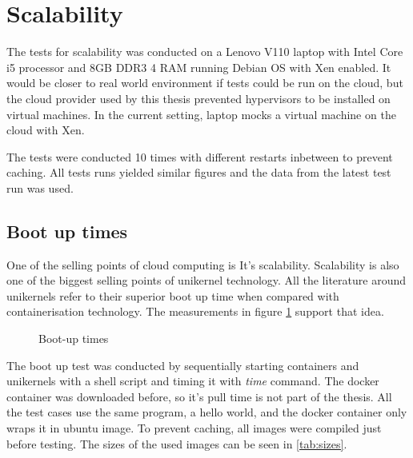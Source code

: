 \section{Scalability}
The tests for scalability was conducted on a Lenovo V110 laptop with Intel Core i5 processor and 8GB DDR3 4 RAM running Debian OS with Xen enabled. It would be closer to real world environment if tests could be run on the cloud, but the cloud provider used by this thesis prevented hypervisors to be installed on virtual machines. In the current setting, laptop mocks a virtual machine on the cloud with Xen.

The tests were conducted 10 times with different restarts inbetween to prevent caching. All tests runs yielded similar figures and the data from the latest test run was used. 
\subsection{Boot up times}


One of the selling points of cloud computing is It's scalability. Scalability is also one of the biggest selling points of unikernel technology. All the literature around unikernels refer to their superior boot up time when compared with containerisation technology. The measurements in figure \ref{fig:boot-up} support that idea. 
\begin{figure}[htpb]
  \centering
    \caption{Boot-up times}\label{fig:boot-up}
  \end{figure}

The boot up test was conducted by sequentially starting containers and unikernels with a shell script and timing it with \textit{time} command. The docker container was downloaded before, so it's pull time is not part of the thesis. All the test cases use the same program, a hello world, and the docker container only wraps it in ubuntu image. To prevent caching, all images were compiled just before testing. The sizes of the used images can be seen in \ref{tab:sizes}.

